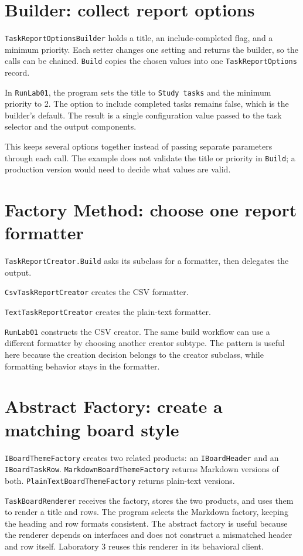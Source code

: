 \documentclass{utmreport}
\begin{document}
\section{Builder: collect report options}
\texttt{TaskReportOptionsBuilder} holds a title, an include-completed flag, and a minimum priority. Each setter changes one setting and returns the builder, so the calls can be chained. \texttt{Build} copies the chosen values into one \texttt{TaskReportOptions} record.

In \texttt{RunLab01}, the program sets the title to \texttt{Study tasks} and the minimum priority to 2. The option to include completed tasks remains false, which is the builder's default. The result is a single configuration value passed to the task selector and the output components.

This keeps several options together instead of passing separate parameters through each call. The example does not validate the title or priority in \texttt{Build}; a production version would need to decide what values are valid.

\section{Factory Method: choose one report formatter}
\texttt{TaskReportCreator.Build} asks its subclass for a formatter, then delegates the output.

\texttt{CsvTaskReportCreator} creates the CSV formatter.

\texttt{TextTaskReportCreator} creates the plain-text formatter.

\texttt{RunLab01} constructs the CSV creator. The same build workflow can use a different formatter by choosing another creator subtype. The pattern is useful here because the creation decision belongs to the creator subclass, while formatting behavior stays in the formatter.

\section{Abstract Factory: create a matching board style}
\texttt{IBoardThemeFactory} creates two related products: an \texttt{IBoardHeader} and an \texttt{IBoardTaskRow}. \texttt{MarkdownBoardThemeFactory} returns Markdown versions of both. \texttt{PlainTextBoardThemeFactory} returns plain-text versions.

\texttt{TaskBoardRenderer} receives the factory, stores the two products, and uses them to render a title and rows. The program selects the Markdown factory, keeping the heading and row formats consistent. The abstract factory is useful because the renderer depends on interfaces and does not construct a mismatched header and row itself. Laboratory 3 reuses this renderer in its behavioral client.
\end{document}
